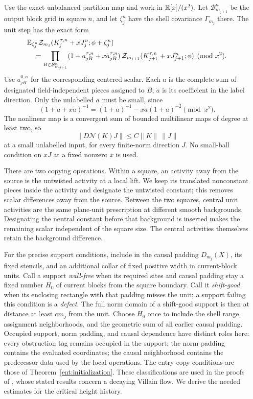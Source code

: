 Use the exact unbalanced partition map and work in
\(\mathbb R[x]/(x^2)\).  Let \(\mathcal B_{m_{j+1}}^n\) be the output
block grid in square \(n\), and let \(\zeta_j^n\) have the shell
covariance \(\Gamma_{m_j}\) there.  The unit step has the exact form
\begin{equation}\label{obs:dual-number-map}
 \begin{split}
 &\mathbb E_{\zeta_j^n}
    \mathcal Z_{m_j}(K_j^{\tau,n}+xJ_j^n;\phi+\zeta_j^n)\\
 &\quad =
 \prod_{B\in\mathcal B_{m_{j+1}}^n}
       (1+a_{jB}^{\tau,n}+x\dot a_{jB}^{\tau,n})\,
 \mathcal Z_{m_{j+1}}(K_{j+1}^{\tau,n}+xJ_{j+1}^n;\phi)
 \pmod{x^2}.
 \end{split}
\end{equation}
Use \(a_{jB}^{0,n}\) for the corresponding centered scalar.
Each \(a\) is the complete sum of designated field-independent pieces
assigned to \(B\); \(\dot a\) is its coefficient in the label
direction.  Only the unlabelled \(a\) must be small, since
\[
 (1+a+x\dot a)^{-1}
       =(1+a)^{-1}-x\dot a(1+a)^{-2}\pmod{x^2}.
\]
The nonlinear map is a convergent sum of bounded multilinear maps
of degree at least two, so
\[
                    \|D\mathcal N(K)J\|
                        \le C\|K\|\,\|J\|
\]
at a small unlabelled input, for every finite-norm direction \(J\).
No small-ball condition on \(xJ\) at a fixed nonzero \(x\) is used.

There are two copying operations.  Within a square, an activity away
from the source is the untwisted activity at a local lift.  We keep
its translated nonconstant pieces inside the activity and designate
the untwisted constant; this removes scalar differences away from the
source.  Between the two squares, central unit activities are the same
plane-unit prescription at different smooth backgrounds.  Designating
the neutral constant before that background is inserted makes the
remaining scalar independent of the square size.  The central
activities themselves retain the background difference.

For the precise support conditions, include in the causal padding
\(D_{m_j}(X)\), its fixed stencils, and an additional collar of fixed
positive width in current-block units.  Call a support \emph{wall-free}
when its required sites and causal padding stay a fixed number \(H_0\)
of current blocks from the square boundary.  Call it \emph{shift-good}
when its enclosing rectangle with that padding misses the unit; a
support failing this condition is a \emph{defect}.  The full norm
domain of a shift-good support is then at distance at least \(c m_j\)
from the unit.  Choose \(H_0\) once to include the shell range,
assignment neighborhoods, and the geometric sum of all earlier causal
padding.  Occupied support,
norm padding, and causal dependence have distinct roles here: every
obstruction tag remains occupied in the support; the norm padding
contains the evaluated coordinates; the causal neighborhood contains
the predecessor data used by the local operations.  The entry copy
conditions are those of Theorem~\ref{ent:initialization}.
These classifications are used in the proofs of
\cite[Propositions~5.5 and~5.7]{B}, whose stated results concern a
decaying Villain flow.  We derive the needed estimates for the
critical height history.

